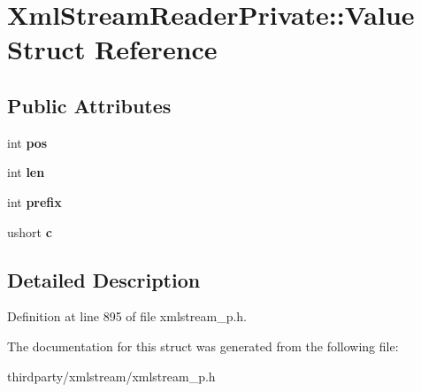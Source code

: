 \hypertarget{struct_xml_stream_reader_private_1_1_value}{}\section{Xml\+Stream\+Reader\+Private\+:\+:Value Struct Reference}
\label{struct_xml_stream_reader_private_1_1_value}
\subsection*{Public Attributes}
\begin{DoxyCompactItemize}
\item 
\mbox{\label{struct_xml_stream_reader_private_1_1_value_a79b23592243c6d9477ccd0272bfccc0a}} 
int {\bfseries pos}
\item 
\mbox{\label{struct_xml_stream_reader_private_1_1_value_a06db4adff5709beaaa839d197b0ee3b8}} 
int {\bfseries len}
\item 
\mbox{\label{struct_xml_stream_reader_private_1_1_value_a9d8fcede1909476b6fd7feceba9ad481}} 
int {\bfseries prefix}
\item 
\mbox{\label{struct_xml_stream_reader_private_1_1_value_a8366e62b455787f0a4e965aeecad5ee9}} 
ushort {\bfseries c}
\end{DoxyCompactItemize}


\subsection{Detailed Description}


Definition at line 895 of file xmlstream\+\_\+p.\+h.



The documentation for this struct was generated from the following file\+:\begin{DoxyCompactItemize}
\item 
thirdparty/xmlstream/xmlstream\+\_\+p.\+h\end{DoxyCompactItemize}
